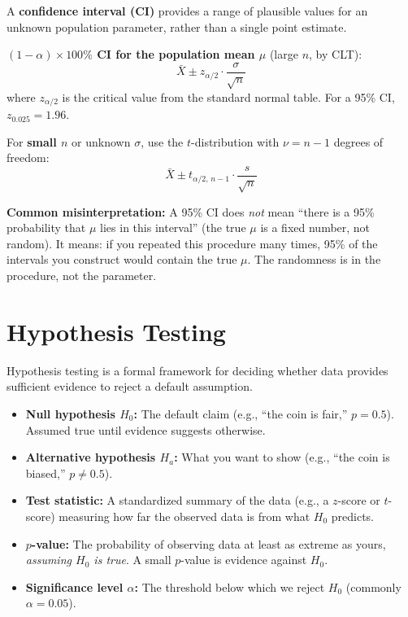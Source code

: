 \documentclass[11pt, letterpaper]{article}
\begin{document}
A \textbf{confidence interval (CI)} provides a range of plausible values for an unknown population parameter, rather than a single point estimate.

\textbf{$(1-\alpha)\times 100\%$ CI for the population mean $\mu$} (large $n$, by CLT):
\[
  \bar{X} \pm z_{\alpha/2} \cdot \frac{\sigma}{\sqrt{n}}
\]
where $z_{\alpha/2}$ is the critical value from the standard normal table. For a 95\% CI, $z_{0.025} = 1.96$.

For \textbf{small $n$} or unknown $\sigma$, use the $t$-distribution with $\nu = n - 1$ degrees of freedom:
\[
  \bar{X} \pm t_{\alpha/2,\,n-1} \cdot \frac{s}{\sqrt{n}}
\]

\begin{tcolorbox}[colback=notebg, colframe=noteborder, arc=3pt, boxrule=1pt]
\textbf{Common misinterpretation:} A 95\% CI does \emph{not} mean ``there is a 95\% probability that $\mu$ lies in this interval'' (the true $\mu$ is a fixed number, not random). It means: if you repeated this procedure many times, 95\% of the intervals you construct would contain the true $\mu$. The randomness is in the procedure, not the parameter.
\end{tcolorbox}

\section*{Hypothesis Testing}

Hypothesis testing is a formal framework for deciding whether data provides sufficient evidence to reject a default assumption.

\begin{itemize}[noitemsep]
  \item \textbf{Null hypothesis $H_0$:} The default claim (e.g., ``the coin is fair,'' $p = 0.5$). Assumed true until evidence suggests otherwise.
  \item \textbf{Alternative hypothesis $H_a$:} What you want to show (e.g., ``the coin is biased,'' $p \neq 0.5$).
  \item \textbf{Test statistic:} A standardized summary of the data (e.g., a $z$-score or $t$-score) measuring how far the observed data is from what $H_0$ predicts.
  \item \textbf{$p$-value:} The probability of observing data at least as extreme as yours, \emph{assuming $H_0$ is true}. A small $p$-value is evidence against $H_0$.
  \item \textbf{Significance level $\alpha$:} The threshold below which we reject $H_0$ (commonly $\alpha = 0.05$).
\end{itemize}
\end{document}
